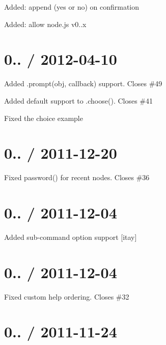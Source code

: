\begin{DoxyItemize}
\item Added\+: append (yes or no) on confirmation
\item Added\+: allow node.\+js v0..\+x
\end{DoxyItemize}

\section*{0.. / 2012-\/04-\/10 }


\begin{DoxyItemize}
\item Added {\ttfamily .prompt(obj, callback)} support. Closes \#49
\item Added default support to .choose(). Closes \#41
\item Fixed the choice example
\end{DoxyItemize}

\section*{0.. / 2011-\/12-\/20 }


\begin{DoxyItemize}
\item Fixed {\ttfamily password()} for recent nodes. Closes \#36
\end{DoxyItemize}

\section*{0.. / 2011-\/12-\/04 }


\begin{DoxyItemize}
\item Added sub-\/command option support \mbox{[}itay\mbox{]}
\end{DoxyItemize}

\section*{0.. / 2011-\/12-\/04 }


\begin{DoxyItemize}
\item Fixed custom help ordering. Closes \#32
\end{DoxyItemize}

\section*{0.. / 2011-\/11-\/24 }


